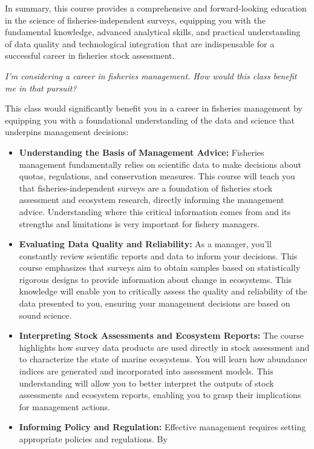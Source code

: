 \documentclass[
  letterpaper,
  oneside,
  open=any]{scrbook}
\providecommand{\tightlist}{%
  \setlength{\itemsep}{0pt}\setlength{\parskip}{0pt}}\usepackage{longtable,booktabs,array}
\begin{document}
In summary, this course provides a comprehensive and forward-looking
education in the science of fisheries-independent surveys, equipping you
with the fundamental knowledge, advanced analytical skills, and
practical understanding of data quality and technological integration
that are indispensable for a successful career in fisheries stock
assessment.

\emph{I'm considering a career in fisheries management. How would this
class benefit me in that pursuit?}

This class would significantly benefit you in a career in fisheries
management by equipping you with a foundational understanding of the
data and science that underpins management decisions:

\begin{itemize}
\tightlist
\item
  \textbf{Understanding the Basis of Management Advice:} Fisheries
  management fundamentally relies on scientific data to make decisions
  about quotas, regulations, and conservation measures. This course will
  teach you that fisheries-independent surveys are a foundation of
  fisheries stock assessment and ecosystem research, directly informing
  the management advice. Understanding where this critical information
  comes from and its strengths and limitations is very important for
  fishery managers.
\item
  \textbf{Evaluating Data Quality and Reliability:} As a manager, you'll
  constantly review scientific reports and data to inform your
  decisions. This course emphasizes that surveys aim to obtain samples
  based on statistically rigorous designs to provide information about
  change in ecosystems. This knowledge will enable you to critically
  assess the quality and reliability of the data presented to you,
  ensuring your management decisions are based on sound science.
\item
  \textbf{Interpreting Stock Assessments and Ecosystem Reports:} The
  course highlights how survey data products are used directly in stock
  assessment and to characterize the state of marine ecosystems. You
  will learn how abundance indices are generated and incorporated into
  assessment models. This understanding will allow you to better
  interpret the outputs of stock assessments and ecosystem reports,
  enabling you to grasp their implications for management actions.
\item
  \textbf{Informing Policy and Regulation:} Effective management
  requires setting appropriate policies and regulations. By

\end{itemize}
\end{document}
